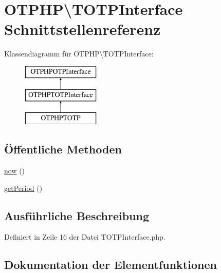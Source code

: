 \hypertarget{interface_o_t_p_h_p_1_1_t_o_t_p_interface}{}\section{O\+T\+P\+HP\textbackslash{}T\+O\+T\+P\+Interface Schnittstellenreferenz}
\label{interface_o_t_p_h_p_1_1_t_o_t_p_interface}
Klassendiagramm für O\+T\+P\+HP\textbackslash{}T\+O\+T\+P\+Interface\+:\begin{figure}[H]
\begin{center}
\leavevmode
\includegraphics[height=3.000000cm]{interface_o_t_p_h_p_1_1_t_o_t_p_interface}
\end{center}
\end{figure}
\subsection*{Öffentliche Methoden}
\begin{DoxyCompactItemize}
\item 
\mbox{\hyperlink{interface_o_t_p_h_p_1_1_t_o_t_p_interface_a0501ec004da411bdc5e2c193dffe8191}{now}} ()
\item 
\mbox{\hyperlink{interface_o_t_p_h_p_1_1_t_o_t_p_interface_a732f73c39b32e6caa9d327d82e8f8303}{get\+Period}} ()
\end{DoxyCompactItemize}


\subsection{Ausführliche Beschreibung}


Definiert in Zeile 16 der Datei T\+O\+T\+P\+Interface.\+php.



\subsection{Dokumentation der Elementfunktionen}
\mbox{\label{interface_o_t_p_h_p_1_1_t_o_t_p_interface_a732f73c39b32e6caa9d327d82e8f8303}} 
